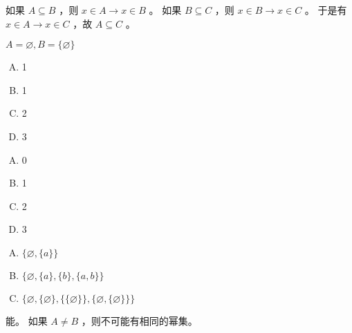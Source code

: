 {{        %
        \begin{practices}
            如果 $A \subseteq B$ ，则 $x \in A \rightarrow x \in B$ 。
            如果 $B \subseteq C$ ，则 $x \in B \rightarrow x \in C$ 。
            于是有 $x \in A \rightarrow x \in C$ ，故 $A \subseteq C$ 。
        \end{practices}

        \begin{practices}
            $A = \varnothing, B = \{\varnothing\}$
        \end{practices}

        \begin{practices}
            \begin{enumerate}[A.]
                \item 1
                \item 1
                \item 2
                \item 3
            \end{enumerate}
        \end{practices}

        \begin{practices}
            \begin{enumerate}[A.]
                \item 0
                \item 1
                \item 2
                \item 3
            \end{enumerate}
        \end{practices}

        \begin{practices}
            \begin{enumerate}[A.]
                \item $\{\varnothing, \{a\}\}$
                \item $\{\varnothing, \{a\}, \{b\}, \{a, b\}\}$
                \item $\{\varnothing, \{\varnothing\}, \{\{\varnothing\}\}, \{\varnothing, \{\varnothing\}\}\}$
            \end{enumerate}
        \end{practices}

        \begin{practices}
            能。
            如果 $A \neq B$ ，则不可能有相同的幂集。
        \end{practices}

}}
